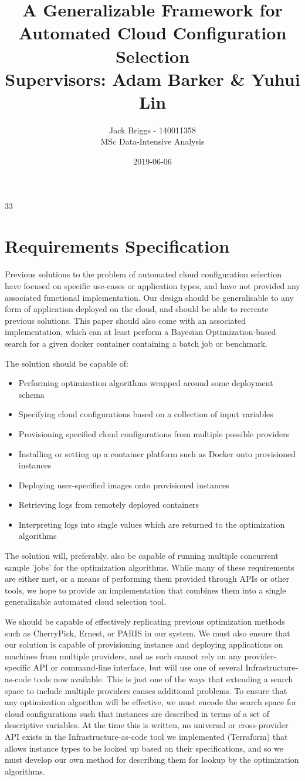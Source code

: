 33\documentclass{article}
\title{\vspace{-2.0cm} A Generalizable Framework for Automated Cloud Configuration Selection \\ \vspace{0.5cm} \large Supervisors: Adam Barker \& Yuhui Lin}
\date{2019-06-06}
\author{Jack Briggs - 140011358 \\ MSc Data-Intensive Analysis}
\begin{document}
\section{Requirements Specification}
Previous solutions to the problem of automated cloud configuration selection have focused on specific use-cases or application types, and have not provided any associated functional implementation.  Our design should be generalisable to any form of application deployed on the cloud, and should be able to recreate previous solutions. This paper should also come with an associated implementation, which can at least perform a Bayesian Optimization-based search for a given docker container containing a batch job or benchmark.

The solution should be capable of:
\begin{itemize}
\item Performing optimization algorithms wrapped around some deployment schema
\item Specifying cloud configurations based on a collection of input variables
\item Provisioning specified cloud configurations from multiple possible providers
\item Installing or setting up a container platform such as Docker onto provisioned instances
\item Deploying user-specified images onto provisioned instances
\item Retrieving logs from remotely deployed containers
\item Interpreting logs into single values which are returned to the optimization algorithms
\end{itemize}

The solution will, preferably, also be capable of running multiple concurrent sample 'jobs' for the optimization algorithms.
While many of these requirements are either met, or a means of performing them provided through APIs or other tools, we hope to provide an implementation that combines them into a single generalizable automated cloud selection tool. 


We should be capable of effectively replicating previous optimization methods such as CherryPick\cite{Alipourfard2017}, Ernest\cite{Venkataraman2016}, or PARIS\cite{Yadwadkar2017} in our system. We must also ensure that our solution is capable of provisioning instance and deploying applications on machines from multiple providers, and as such cannot rely on any provider-specific API or command-line interface, but will use one of several Infrastructure-as-code tools now available. This is just one of the ways that extending a search space to include multiple providers causes additional problems. To ensure that any optimization algorithm will be effective, we must encode the search space for cloud configurations such that instances are described in terms of a set of descriptive variables. At the time this is written, no universal or cross-provider API exists in the  Infrastructure-as-code tool we implemented (Terraform) that allows instance types to be looked up based on their specifications, and so we must develop our own method for describing them for lookup by the optimization algorithms.  
\end{document}
